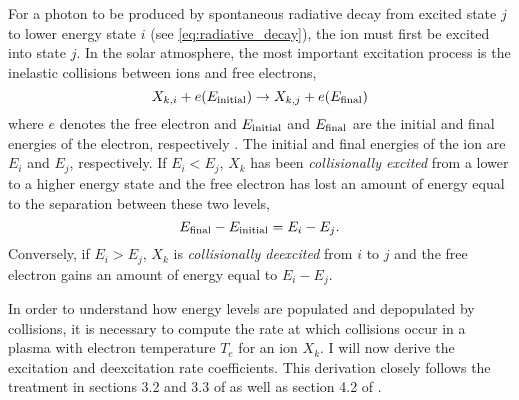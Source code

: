 For a photon to be produced by spontaneous radiative decay from excited state $j$ to lower energy state $i$ (see \autoref{eq:radiative_decay}), the ion must first be excited into state $j$. In the solar atmosphere, the most important excitation process is the inelastic collisions between ions and free electrons,
\begin{equation}\label{eq:inelastic_collisions}
    X_{k,i} + e(E_{\textup{initial}}) \to X_{k,j} + e(E_{\textup{final}})
\end{equation}
where $e$ denotes the free electron and $E_{\textup{initial}}$ and $E_{\textup{final}}$ are the initial and final energies of the electron, respectively \citep{phillips_ultraviolet_2008}. The initial and final energies of the ion are $E_i$ and $E_j$, respectively. If $E_i<E_j$, $X_k$ has been \textit{collisionally excited} from a lower to a higher energy state and the free electron has lost an amount of energy equal to the separation between these two levels,
\begin{equation*}
    E_{\textup{final}} - E_{\textup{initial}}  = E_i - E_j.
\end{equation*}
Conversely, if $E_i>E_j$, $X_k$ is \textit{collisionally deexcited} from $i$ to $j$ and the free electron gains an amount of energy equal to $E_i - E_j$.


In order to understand how energy levels are populated and depopulated by collisions, it is necessary to compute the rate at which collisions occur in a plasma with electron temperature $T_e$ for an ion $X_k$. I will now derive the excitation and deexcitation rate coefficients. This derivation closely follows the treatment in sections 3.2 and 3.3 of \citet{del_zanna_solar_2018} as well as section 4.2 of \citet{phillips_ultraviolet_2008}.  

